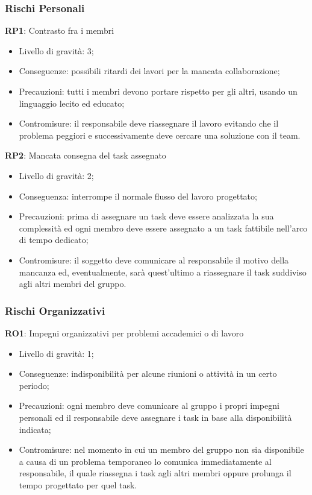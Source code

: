 \subsubsection{Rischi Personali}
\textbf{RP1}: 
Contrasto fra i membri
\begin{itemize}
\item Livello di gravità: 3;
\item Conseguenze: possibili ritardi dei lavori per la mancata collaborazione;
\item Precauzioni: tutti i membri devono portare rispetto per gli altri, usando un linguaggio lecito ed educato;
\item Contromisure: il responsabile deve riassegnare il lavoro evitando che il problema peggiori e successivamente deve cercare una soluzione con il team.
\end{itemize}
\textbf{RP2}:
Mancata consegna del task assegnato
\begin{itemize}
\item Livello di gravità: 2;
\item Conseguenza: interrompe il normale flusso del lavoro progettato;
\item Precauzioni: prima di assegnare un task deve essere analizzata la sua complessità ed ogni membro deve essere assegnato a un task fattibile nell'arco di tempo dedicato;
\item Contromisure: il soggetto deve comunicare al responsabile il motivo della mancanza ed, eventualmente, sarà quest'ultimo a riassegnare il task suddiviso agli altri membri del gruppo.
\end{itemize}

\subsubsection{Rischi Organizzativi}
\textbf{RO1}: 
Impegni organizzativi per problemi accademici o di lavoro
\begin{itemize}
\item Livello di gravità: 1;
\item Conseguenze: indisponibilità per alcune riunioni o attività in un certo periodo;
\item Precauzioni: ogni membro deve comunicare al gruppo i propri impegni personali ed il responsabile deve assegnare i task in base alla disponibilità indicata;
\item Contromisure: nel momento in cui un membro del gruppo non sia disponibile a causa di un problema temporaneo lo comunica immediatamente al responsabile, il quale riassegna i task agli altri membri oppure prolunga il tempo progettato per quel task.
\end{itemize}

